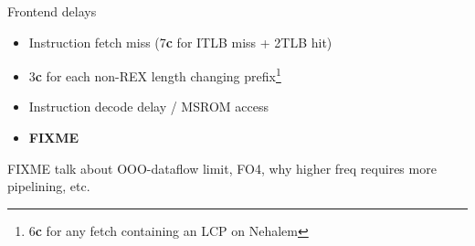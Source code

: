 \documentclass[mathserif,xcolor={dvipsnames,table}]{beamer}
\begin{document}
\begin{frame}{Frontend delays}
\begin{itemize}
\item Instruction fetch miss (7\textbf{c} for ITLB miss + 2TLB hit)
\item 3\textbf{c} for each non-REX length changing prefix\footnote{6\textbf{c} for any fetch containing an LCP on Nehalem}
\item Instruction decode delay / MSROM access
\item \huge\textbf{FIXME}
\end{itemize}
\end{frame}

\begin{frame}
\huge FIXME talk about OOO-dataflow limit, FO4, why higher freq requires more
pipelining, etc.
\end{frame}
\end{document}
